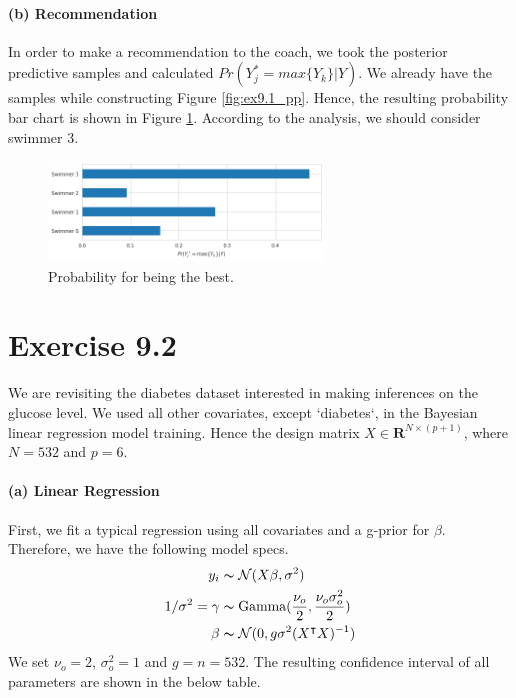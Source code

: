 \documentclass[11pt, letterpaper]{article}
\begin{document}
\paragraph{(b) Recommendation}
In order to make a recommendation to the coach, we took the posterior predictive samples and calculated $Pr(Y_j^* = max\{Y_k\}|Y)$. We already have the samples while constructing Figure \ref{fig:ex9.1_pp}. Hence, the resulting probability bar chart is shown in Figure \ref{fig:ex9.1_pp_pr_max}. According to the analysis, we should consider swimmer 3.
\begin{figure}[!h]
  \centering
  \includegraphics[width=0.65\textwidth]{1.4.png}
  \captionsetup{justification=centering}
  \caption{Probability for being the best.}
  \label{fig:ex9.1_pp_pr_max}
\end{figure}


\newpage
\section{Exercise 9.2}
We are revisiting the diabetes dataset interested in making inferences on the glucose level. We used all other covariates, except `diabetes`, in the Bayesian linear regression model training. Hence the design matrix $X \in \mathbf{R}^{N\times (p+1)}$, where $N = 532$ and $p = 6$.

\paragraph{(a) Linear Regression}
First, we fit a typical regression using all covariates and a g-prior for $\beta$. Therefore, we have the following model specs.
\begin{align*}
    y_i &\thicksim \mathcal{N}(X\beta, \sigma^2) \\
    1/\sigma^2 = \gamma &\thicksim \text{Gamma}(\frac{\nu_o}{2}, \frac{\nu_o\sigma_o^2}{2}) \\
    \beta &\thicksim \mathcal{N}(0, g\sigma^2(X^{\intercal}X)^{-1})
\end{align*}
We set $\nu_o = 2$, $\sigma^2_o = 1$ and $g = n = 532$. The resulting confidence interval of all parameters are shown in the below table.
\end{document}
